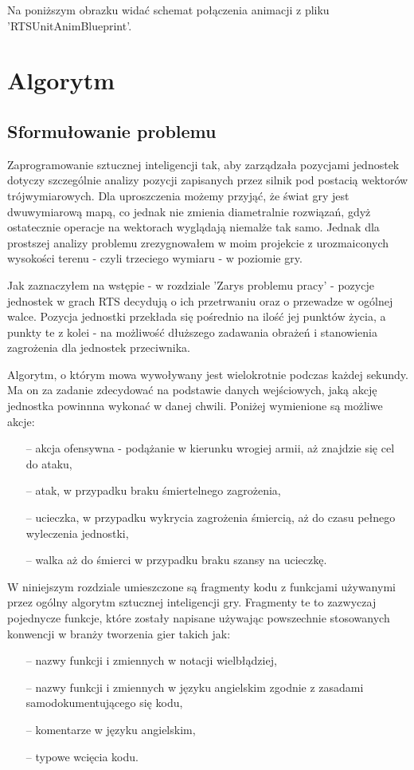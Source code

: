 \documentclass[12pt]{report}
\begin{document}
Na poniższym obrazku widać schemat połączenia animacji z pliku 'RTSUnitAnimBlueprint'.


\chapter{Algorytm}
\section{Sformułowanie problemu}
Zaprogramowanie sztucznej inteligencji tak, aby zarządzała pozycjami jednostek dotyczy szczególnie analizy pozycji zapisanych przez silnik pod postacią wektorów trójwymiarowych. Dla uproszczenia możemy przyjąć, że świat gry jest dwuwymiarową mapą, co jednak nie zmienia diametralnie rozwiązań, gdyż ostatecznie operacje na wektorach wyglądają niemalże tak samo. Jednak dla prostszej analizy problemu zrezygnowałem w moim projekcie z urozmaiconych wysokości terenu - czyli trzeciego wymiaru - w poziomie gry.

Jak zaznaczyłem na wstępie - w rozdziale 'Zarys problemu pracy' - pozycje jednostek w grach RTS decydują o ich przetrwaniu oraz o przewadze w ogólnej walce. Pozycja jednostki przekłada się pośrednio na ilość jej punktów życia, a punkty te z kolei - na możliwość dłuższego zadawania obrażeń i stanowienia zagrożenia dla jednostek przeciwnika.

Algorytm, o którym mowa wywoływany jest wielokrotnie podczas każdej sekundy. Ma on za zadanie zdecydować na podstawie danych wejściowych, jaką akcję jednostka powinnna wykonać w danej chwili. Poniżej wymienione są możliwe akcje:
\begin{itemize}
\item[--] akcja ofensywna - podążanie w kierunku wrogiej armii, aż znajdzie się cel do ataku,
\item[--] atak, w przypadku braku śmiertelnego zagrożenia,
\item[--] ucieczka, w przypadku wykrycia zagrożenia śmiercią, aż do czasu pełnego wyleczenia jednostki,
\item[--] walka aż do śmierci w przypadku braku szansy na ucieczkę.
\end{itemize}

W niniejszym rozdziale umieszczone są fragmenty kodu z funkcjami używanymi przez ogólny algorytm sztucznej inteligencji gry. Fragmenty te to zazwyczaj pojednycze funkcje, które zostały napisane używając powszechnie stosowanych konwencji w branży tworzenia gier takich jak:
\begin{itemize}
\item[--] nazwy funkcji i zmiennych w notacji wielbłądziej,
\item[--] nazwy funkcji i zmiennych w języku angielskim zgodnie z zasadami samodokumentującego się kodu,
\item[--] komentarze w języku angielskim,
\item[--] typowe wcięcia kodu.
\end{itemize}
\end{document}
